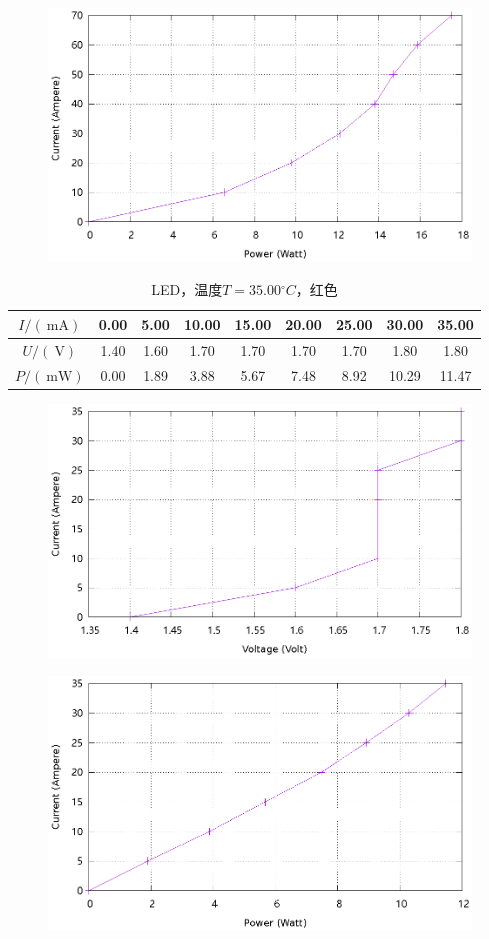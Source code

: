 \documentclass{ctexart}
\newcommand{\si}[1]{\  \mathrm{#1}}
\begin{document}
\begin{figure}[H]
    \centering
    \includegraphics[width=0.9\linewidth]{../output/led-pc-4.gnuplot}
\end{figure}
\newpage
\begin{table}[H]
    \centering
    \begin{tabular}{|c|c|c|c|c|c|c|c|c|}
        \hline
        $I/(\si{mA})$ & 0.00 & 5.00 & 10.00 & 15.00 & 20.00 & 25.00 & 30.00 & 35.00 \\\hline
        $U / (\si{V})$  & 1.40 & 1.60 & 1.70 & 1.70 & 1.70 & 1.70 & 1.80 & 1.80 \\\hline
        $P / (\si{mW})$ & 0.00 & 1.89 & 3.88 & 5.67 & 7.48 & 8.92 & 10.29 & 11.47 \\\hline
    \end{tabular}
    \caption{LED，温度$T=35.00{}^{\circ}C$，红色}
\end{table}
\begin{figure}[H]
    \centering
    \includegraphics[width=0.9\linewidth]{../output/led-vc-5.gnuplot}
\end{figure}
\begin{figure}[H]
    \centering
    \includegraphics[width=0.9\linewidth]{../output/led-pc-5.gnuplot}
\end{figure}
\end{document}
